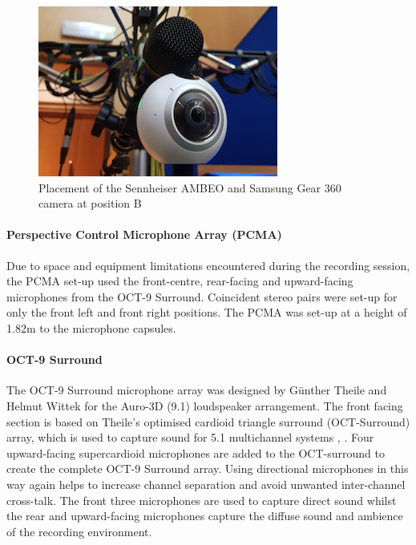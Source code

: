 			\begin{figure}[h]
			\begin{center}
				\includegraphics[width = \linewidth]{images/other/ambeopic.png}
				\caption{Placement of the Sennheiser AMBEO and Samsung Gear 360 camera at position B}
				\label{ambeopic}
			\end{center}
			\end{figure}

			\paragraph{Perspective Control Microphone Array (PCMA)}
			Due to space and equipment limitations encountered during the recording session, the PCMA set-up used the front-centre, rear-facing and upward-facing microphones from the OCT-9 Surround. Coincident stereo pairs were set-up for only the front left and front right positions. The PCMA was set-up at a height of 1.82m to the microphone capsules.\\

			\paragraph{OCT-9 Surround}
			The OCT-9 Surround microphone array was designed by G\"{u}nther Theile and Helmut Wittek for the Auro-3D (9.1) loudspeaker arrangement. The front facing section is based on Theile's optimised cardioid triangle surround (OCT-Surround) array, which is used to capture sound for 5.1 multichannel systems \cite{TheileWittek}, \cite{Theile}. Four upward-facing supercardioid microphones are added to the OCT-surround to create the complete OCT-9 Surround array. Using directional microphones in this way again helps to increase channel separation and avoid unwanted inter-channel cross-talk. The front three microphones are used to capture direct sound whilst the rear and upward-facing microphones capture the diffuse sound and ambience of the recording environment. \\



